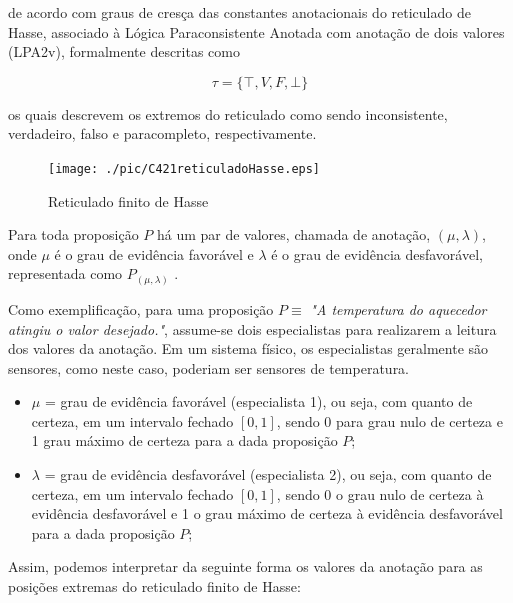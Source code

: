 de acordo com graus de cresça das constantes anotacionais do reticulado de Hasse, associado à Lógica Paraconsistente Anotada com anotação de dois valores (LPA2v), formalmente descritas como 

\begin{center}
\begin{equation}
  \tau = \{ \top , V, F, \bot \}
\end{equation}
\end{center}

os quais descrevem os extremos do reticulado como sendo inconsistente, verdadeiro, falso e paracompleto, respectivamente. 

\begin{figure}[!htb]
\center\texttt{[image: ./pic/C421reticuladoHasse.eps]}
\caption{Reticulado finito de Hasse}
\label{fig:reticuladoHasse}
\end{figure}

Para toda proposição $P$ há um par de valores, chamada de anotação, $(\mu , \lambda )$, onde $\mu$ é o grau de evidência favorável e $\lambda $ é o grau de evidência desfavorável, representada como  $P_{( \mu , \lambda )}$ .

Como exemplificação, para uma proposição $P \equiv$ \emph{"A temperatura do aquecedor atingiu o valor desejado."}, assume-se dois especialistas para realizarem a leitura dos valores da anotação. Em um sistema físico, os especialistas geralmente são sensores, como neste caso, poderiam ser sensores de temperatura.

\begin{itemize}
\item 
$\mu$ = grau de evidência favorável (especialista 1), ou seja, com quanto de certeza, em um intervalo fechado $[0,1]$, sendo 0 para grau nulo de certeza e 1 grau máximo de certeza para a dada proposição $P$;

\item
$\lambda$ = grau de evidência desfavorável (especialista 2), ou seja, com quanto de certeza, em um intervalo fechado $[0,1]$, sendo 0 o grau nulo de certeza à evidência desfavorável e 1 o grau máximo de certeza à evidência desfavorável para a dada proposição $P$;

\end{itemize}


Assim, podemos interpretar da seguinte forma os valores da anotação para as posições extremas do reticulado finito de Hasse:


